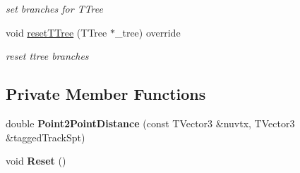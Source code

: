 \begin{DoxyCompactItemize}
\begin{DoxyCompactList}\small\item\em set branches for T\+Tree \end{DoxyCompactList}\item 
void \hyperlink{classanalysis_1_1CRTApproachAnalysis_a82b4234fdad706613efdb29fb89e8581}{reset\+T\+Tree} (T\+Tree $\ast$\+\_\+tree) override\hypertarget{classanalysis_1_1CRTApproachAnalysis_a82b4234fdad706613efdb29fb89e8581}{}\label{classanalysis_1_1CRTApproachAnalysis_a82b4234fdad706613efdb29fb89e8581}

\begin{DoxyCompactList}\small\item\em reset ttree branches \end{DoxyCompactList}\end{DoxyCompactItemize}
\subsection*{Private Member Functions}
\begin{DoxyCompactItemize}
\item 
double {\bfseries Point2\+Point\+Distance} (const T\+Vector3 \&nuvtx, T\+Vector3 \&tagged\+Track\+Spt)\hypertarget{classanalysis_1_1CRTApproachAnalysis_aad7633096ac24f335774fee3908b5cb7}{}\label{classanalysis_1_1CRTApproachAnalysis_aad7633096ac24f335774fee3908b5cb7}

\item 
void {\bfseries Reset} ()\hypertarget{classanalysis_1_1CRTApproachAnalysis_abff1e05cb70a3d88d03d3ef670c114e7}{}\label{classanalysis_1_1CRTApproachAnalysis_abff1e05cb70a3d88d03d3ef670c114e7}

\end{DoxyCompactItemize}
